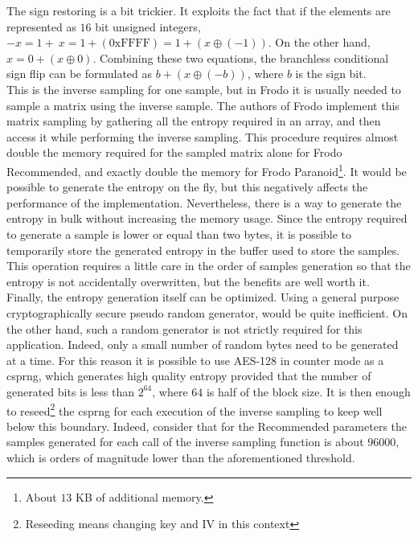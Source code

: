 The sign restoring is a bit trickier. It exploits the fact that if the elements are represented as $16$ bit unsigned integers, $-x=1+~x=1+(\text{0xFFFF})=1+(x\oplus(-1))$. On the other hand, $x=0+(x\oplus0)$. Combining these two equations, the branchless conditional sign flip can be formulated as $b+(x\oplus(-b))$, where $b$ is the sign bit.\\
This is the inverse sampling for one sample, but in Frodo it is usually needed to sample a matrix using the inverse sample. The authors of Frodo implement this matrix sampling by gathering all the entropy required in an array, and then access it while performing the inverse sampling. This procedure requires almost double the memory required for the sampled matrix alone for Frodo Recommended, and exactly double the memory for Frodo Paranoid\footnote{About $13$ KB of additional memory.}. It would be possible to generate the entropy on the fly, but this negatively affects the performance of the implementation. Nevertheless, there is a way to generate the entropy in bulk without increasing the memory usage. Since the entropy required to generate a sample is lower or equal than two bytes, it is possible to temporarily store the generated entropy in the buffer used to store the samples. This operation requires a little care in the order of samples generation so that the entropy is not accidentally overwritten, but the benefits are well worth it.\\
Finally, the entropy generation itself can be optimized. Using a general purpose cryptographically secure pseudo random generator, would be quite inefficient. On the other hand, such a random generator is not strictly required for this application. Indeed, only a small number of random bytes need to be generated at a time. For this reason it is possible to use AES-128 in counter mode as a csprng, which generates high quality entropy provided that the number of generated bits is less than $2^{64}$, where $64$ is half of the block size. It is then enough to reseed\footnote{Reseeding means changing key and IV in this context} the csprng for each execution of the inverse sampling to keep well below this boundary. Indeed, consider that for the Recommended parameters the samples generated for each call of the inverse sampling function is about $96000$, which is orders of magnitude lower than the aforementioned threshold. 


